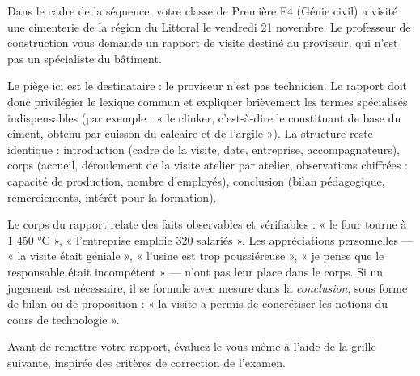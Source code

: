 \documentclass[11pt]{article}
\newcommand{\cle}[1]{{\popxbold\color{popdark}#1}}
\newcounter{popsec}
\newcounter{popsub}
\newcommand{\courssub}[1]{%
  \stepcounter{popsub}%
  \par\vspace{9pt}\noindent{\popxbold\fontsize{11.5}{13}\selectfont\color{popink}{\color{poporange}\thepopsec.\thepopsub}\hspace{6pt}#1}\par\nopagebreak\vspace{4pt}
}
\begin{document}
\begin{exemplebox}
Dans le cadre de la séquence, votre classe de Première F4 (Génie civil) a visité une cimenterie de la région du Littoral le vendredi 21 novembre. Le professeur de construction vous demande un rapport de visite destiné au proviseur, qui n'est pas un spécialiste du bâtiment.
\end{exemplebox}

Le piège ici est le \cle{destinataire} : le proviseur n'est pas technicien. Le rapport doit donc privilégier le \cle{lexique commun} et expliquer brièvement les termes spécialisés indispensables (par exemple : « le clinker, c'est-à-dire le constituant de base du ciment, obtenu par cuisson du calcaire et de l'argile »). La structure reste identique : introduction (cadre de la visite, date, entreprise, accompagnateurs), corps (accueil, déroulement de la visite atelier par atelier, observations chiffrées : capacité de production, nombre d'employés), conclusion (bilan pédagogique, remerciements, intérêt pour la formation).

\begin{attention}
Le corps du rapport relate des \cle{faits} observables et vérifiables : « le four tourne à 1 450 °C », « l'entreprise emploie 320 salariés ». Les appréciations personnelles — « la visite était géniale », « l'usine est trop poussiéreuse », « je pense que le responsable était incompétent » — n'ont pas leur place dans le corps. Si un jugement est nécessaire, il se formule avec mesure dans la \emph{conclusion}, sous forme de bilan ou de proposition : « la visite a permis de concrétiser les notions du cours de technologie ».
\end{attention}

\courssub{La grille d'auto-évaluation}

Avant de remettre votre rapport, évaluez-le vous-même à l'aide de la grille suivante, inspirée des critères de correction de l'examen.
\end{document}
